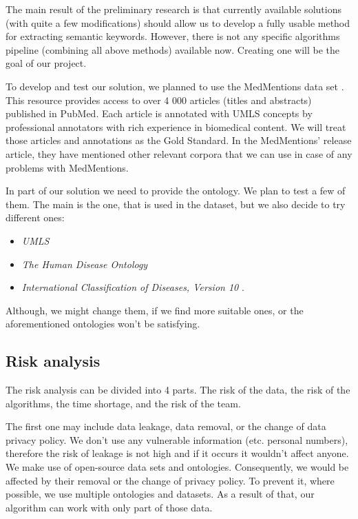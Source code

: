 \documentclass[11pt]{article}
\begin{document}
The main result of the preliminary research is that currently available solutions (with quite a few modifications) should allow us to develop a fully usable method for extracting semantic keywords. However, there is not any specific algorithms pipeline (combining all above methods) available now. Creating one will be the goal of our project.  

To develop and test our solution, we planned to use the MedMentions data set \cite{MedMentions}. This resource provides access to over 4 000 articles (titles and abstracts) published in PubMed. Each article is annotated with UMLS \cite{UMLS} concepts by professional annotators with rich experience in biomedical content. We will treat those articles and annotations as the Gold Standard. In the MedMentions' release article, they have mentioned other relevant corpora that we can use in case of any problems with MedMentions. 


In part of our solution we need to provide the ontology. We plan to test a few of them. The main is the one, that is used in the dataset, but we also decide to try different ones:
\begin{itemize}
    \item \textit{UMLS} \cite{UMLS}
    \item \textit{The Human Disease Ontology} \cite{10.1093/bioinformatics/btaa1057}
    \item \textit{International Classification of Diseases, Version 10} \cite{conf/ic3k/MollerSBEDS10}.
\end{itemize}
Although, we might change them, if we find more suitable ones, or the aforementioned ontologies won't be satisfying. 
\subsection{Risk analysis}
The risk analysis can be divided into 4 parts. The risk of the data, the risk of the algorithms, the time shortage, and the risk of the team.

The first one may include data leakage, data removal, or the change of data privacy policy. We don’t use any vulnerable information (etc. personal numbers), therefore the risk of leakage is not high and if it occurs it wouldn’t affect anyone. We make use of open-source data sets and ontologies. Consequently, we would be affected by their removal or the change of privacy policy. To prevent it, where possible, we use multiple ontologies and datasets. As a result of that, our algorithm can work with only part of those data. 
\end{document}
